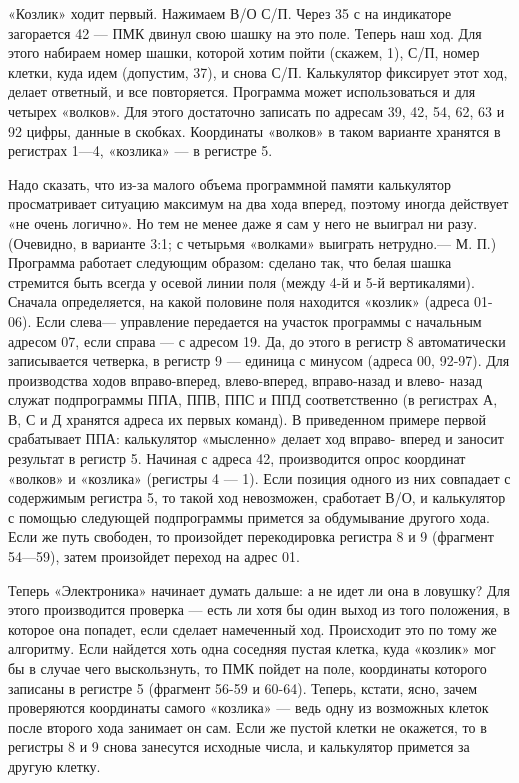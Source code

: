 \documentclass[11pt,a4paper,oneside]{article}
\begin{document}
«Козлик» ходит первый. Нажимаем В/О С/П. Через 35 с на индикаторе загорается 42 — ПМК двинул свою шашку на это поле. Теперь наш ход. Для этого набираем номер шашки, которой хотим пойти (скажем, 1), С/П, номер клетки, куда идем (допустим, 37), и снова С/П. Калькулятор фиксирует этот ход, делает ответный, и все повторяется. Программа может использоваться и для четырех «волков». Для этого достаточно записать по адресам 39, 42, 54, 62, 63 и 92 цифры, данные в скобках. Координаты «волков» в таком варианте хранятся в регистрах 1—4, «козлика» — в регистре 5.

Надо сказать, что из-за малого объема программной памяти калькулятор просматривает ситуацию максимум на два хода вперед, поэтому иногда действует «не очень логично». Но тем не менее даже я сам у него не выиграл ни разу. (Очевидно, в варианте 3:1; с четырьмя «волками» выиграть нетрудно.— М. П.) Программа работает следующим образом: сделано так, что белая шашка стремится быть всегда у осевой линии поля (между 4-й и 5-й вертикалями). Сначала определяется, на какой половине поля находится «козлик» (адреса 01-06). Если слева— управление передается на участок программы с начальным адресом 07, если справа — с адресом 19. Да, до этого в регистр 8 автоматически записывается четверка, в регистр 9 — единица с минусом (адреса 00, 92-97). Для производства ходов вправо-вперед, влево-вперед, вправо-назад и влево- назад служат подпрограммы ППА, ППВ, ППС и ППД соответственно (в регистрах А, В, С и Д хранятся адреса их первых команд). В приведенном примере первой срабатывает ППА: калькулятор «мысленно» делает ход вправо- вперед и заносит результат в регистр 5. Начиная с адреса 42, производится опрос координат «волков» и «козлика» (регистры 4 — 1). Если позиция одного из них совпадает с содержимым регистра 5, то такой ход невозможен, сработает В/О, и калькулятор с помощью следующей подпрограммы примется за обдумывание другого хода. Если же путь свободен, то произойдет перекодировка регистра 8 и 9 (фрагмент 54—59), затем произойдет переход на адрес 01.

Теперь «Электроника» начинает думать дальше: а не идет ли она в ловушку? Для этого производится проверка — есть ли хотя бы один выход из того положения, в которое она попадет, если сделает намеченный ход. Происходит это по тому же алгоритму. Если найдется хоть одна соседняя пустая клетка, куда «козлик» мог бы в случае чего выскользнуть, то ПМК пойдет на поле, координаты которого записаны в регистре 5 (фрагмент 56-59 и 60-64). Теперь, кстати, ясно, зачем проверяются координаты самого «козлика» — ведь одну из возможных клеток после второго хода занимает он сам. Если же пустой клетки не окажется, то в регистры 8 и 9 снова занесутся исходные числа, и калькулятор примется за другую клетку.
\end{document}
